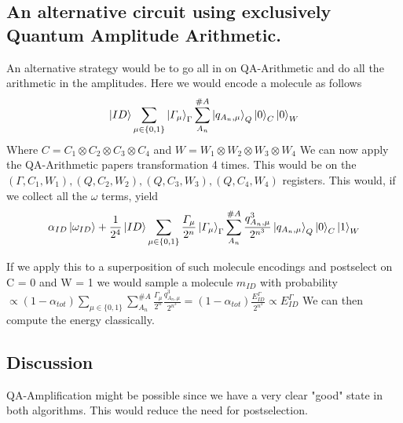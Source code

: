 \documentclass{article}
\begin{document}
\subsection{An alternative circuit using exclusively Quantum Amplitude Arithmetic.}
An alternative strategy would be to go all in on QA-Arithmetic and do all the arithmetic in the amplitudes. 
Here we would encode a molecule as follows
\begin{equation}
    \ket{ID}\sum_{\mu\in\{0,1\}}\ket{\varGamma_\mu}_\Gamma\sum_{A_n}^{\#A}\ket{q_{A_n,\mu}}_Q\ket{0}_{C}\ket{0}_{W}
\end{equation}
Where $C = C_1\otimes C_2\otimes C_3\otimes C_4$ and $W = W_1\otimes W_2\otimes W_3\otimes W_4$
We can now apply the QA-Arithmetic papers transformation 4 times. This would be on the $(\Gamma,C_1,W_1), (Q,C_2,W_2), (Q,C_3,W_3), (Q,C_4,W_4)$ registers.
This would, if we collect all the $\omega$ terms, yield
\begin{equation}
    \alpha_{ID}\ket{\omega_{ID}}+\frac{1}{2^4}\ket{ID}\sum_{\mu\in\{0,1\}}\frac{\varGamma_\mu}{2^{n}}\ket{\varGamma_\mu}_\Gamma\sum_{A_n}^{\#A}\frac{q_{A_n,\mu}^3}{2^{n^3}}\ket{q_{A_n,\mu}}_Q\ket{0}_{C}\ket{1}_{W}
\end{equation}

If we apply this to a superposition of such molecule encodings and postselect on C = 0 and W = 1 we would sample a molecule $m_{ID}$ with probability $\propto
    (1-\alpha_{tot})\sum_{\mu\in\{0,1\}}\sum_{A_n}^{\#A}\frac{\varGamma_\mu}{2^{n}}\frac{q_{A_n,\mu}^3}{2^{n^3}} =  (1-\alpha_{tot})\frac{E^\Gamma_{ID}}{2^{n^4}}\propto E^\Gamma_{ID}
$
We can then compute the energy classically. 
\subsection{Discussion}
QA-Amplification might be possible since we have a very clear "good" state in both algorithms. This would reduce the need for postselection.
\end{document}
